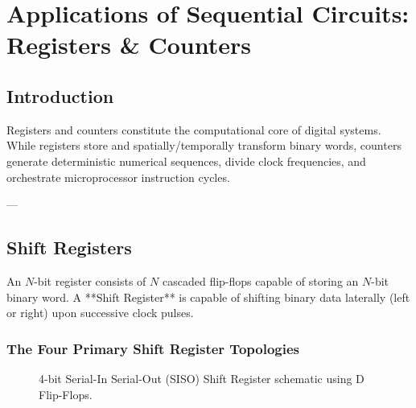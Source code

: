 \chapter{Applications of Sequential Circuits: Registers \& Counters}
\label{chap:sequential-applications}

\section{Introduction}
Registers and counters constitute the computational core of digital systems. While registers store and spatially/temporally transform binary words, counters generate deterministic numerical sequences, divide clock frequencies, and orchestrate microprocessor instruction cycles.

---

\section{Shift Registers}
An $N$-bit register consists of $N$ cascaded flip-flops capable of storing an $N$-bit binary word. A **Shift Register** is capable of shifting binary data laterally (left or right) upon successive clock pulses.

\subsection{The Four Primary Shift Register Topologies}

\begin{figure}[htbp]
\centering
{}
\caption{4-bit Serial-In Serial-Out (SISO) Shift Register schematic using D Flip-Flops.}
\label{fig:siso-register}
\end{figure}

